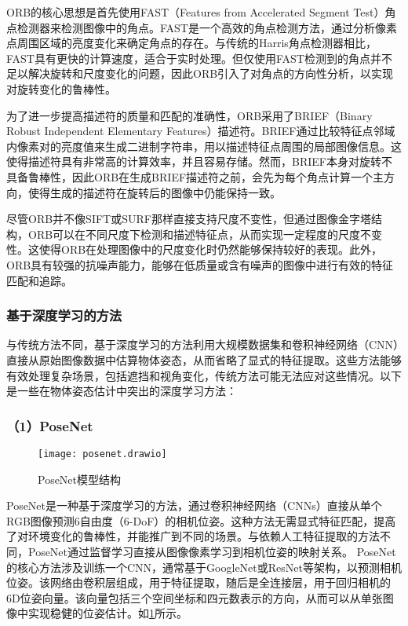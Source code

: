 ORB的核心思想是首先使用FAST（Features from Accelerated Segment Test）角点检测器来检测图像中的角点。FAST是一个高效的角点检测方法，通过分析像素点周围区域的亮度变化来确定角点的存在。与传统的Harris角点检测器相比，FAST具有更快的计算速度，适合于实时处理。但仅使用FAST检测到的角点并不足以解决旋转和尺度变化的问题，因此ORB引入了对角点的方向性分析，以实现对旋转变化的鲁棒性。

为了进一步提高描述符的质量和匹配的准确性，ORB采用了BRIEF（Binary Robust Independent Elementary Features）描述符。BRIEF通过比较特征点邻域内像素对的亮度值来生成二进制字符串，用以描述特征点周围的局部图像信息。这使得描述符具有非常高的计算效率，并且容易存储。然而，BRIEF本身对旋转不具备鲁棒性，因此ORB在生成BRIEF描述符之前，会先为每个角点计算一个主方向，使得生成的描述符在旋转后的图像中仍能保持一致。

尽管ORB并不像SIFT或SURF那样直接支持尺度不变性，但通过图像金字塔结构，ORB可以在不同尺度下检测和描述特征点，从而实现一定程度的尺度不变性。这使得ORB在处理图像中的尺度变化时仍然能够保持较好的表现。此外，ORB具有较强的抗噪声能力，能够在低质量或含有噪声的图像中进行有效的特征匹配和追踪。

\subsubsection{基于深度学习的方法}
与传统方法不同，基于深度学习的方法利用大规模数据集和卷积神经网络（CNN）直接从原始图像数据中估算物体姿态，从而省略了显式的特征提取。这些方法能够有效处理复杂场景，包括遮挡和视角变化，传统方法可能无法应对这些情况。以下是一些在物体姿态估计中突出的深度学习方法：
 \subsubsection*{（1）PoseNet}
 \begin{figure}[htb]
 	\texttt{[image: posenet.drawio]}
 	\caption[PoseNet模型结构]{PoseNet模型结构} %
 	\label{fig:posenet.drawio}
 \end{figure}
 
PoseNet是一种基于深度学习的方法，通过卷积神经网络（CNNs）直接从单个RGB图像预测6自由度（6-DoF）的相机位姿。这种方法无需显式特征匹配，提高了对环境变化的鲁棒性，并能推广到不同的场景。与依赖人工特征提取的方法不同，PoseNet通过监督学习直接从图像像素学习到相机位姿的映射关系。
PoseNet的核心方法涉及训练一个CNN，通常基于GoogleNet或ResNet等架构，以预测相机位姿。该网络由卷积层组成，用于特征提取，随后是全连接层，用于回归相机的6D位姿向量。该向量包括三个空间坐标和四元数表示的方向，从而可以从单张图像中实现稳健的位姿估计。如\cref{fig:posenet.drawio}所示。

